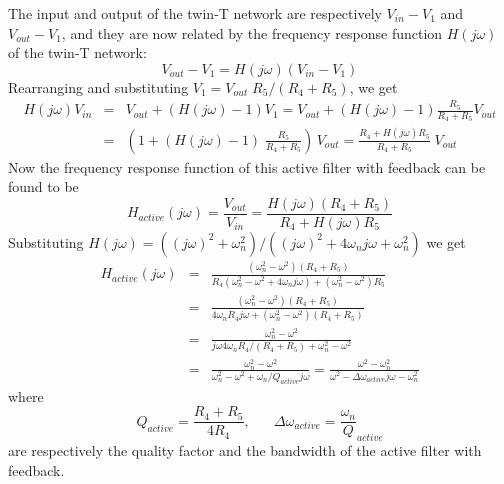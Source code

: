 \documentclass{article}
\begin{document}
The input and output of the twin-T network are respectively $V_{in}-V_1$ and
$V_{out}-V_1$, and they are now related by the frequency response function 
$H(j\omega)$ of the twin-T network:
\begin{equation}
V_{out}-V_1=H(j\omega)(V_{in}-V_1)
\end{equation}
Rearranging and substituting $V_1=V_{out}\;R_5/(R_4+R_5)$, we get
\begin{eqnarray}
  H(j\omega)V_{in}&=&V_{out}+(H(j\omega)-1) V_1
  =V_{out}+(H(j\omega)-1)\frac{R_5}{R_4+R_5}V_{out}
  \nonumber \\
  &=&\left(1+(H(j\omega)-1)\;\frac{R_5}{R_4+R_5}\right)\,V_{out}
  =\frac{R_4+H(j\omega)R_5}{R_4+R_5}\;V_{out}
\end{eqnarray}
Now the frequency response function of this active filter with feedback 
can be found to be
\begin{equation}
H_{active}(j\omega)=\frac{V_{out}}{V_{in}}
=\frac{H(j\omega)(R_4+R_5)}{R_4+H(j\omega)R_5}
\end{equation}
Substituting $H(j\omega)=((j\omega)^2+\omega_n^2)/((j\omega)^2+4\omega_n j\omega
+\omega_n^2)$ we get
\begin{eqnarray}
  H_{active}(j\omega)&=&\frac{(\omega_n^2-\omega^2)(R_4+R_5)}
  {R_4(\omega_n^2-\omega^2+4\omega_n j\omega)+(\omega_n^2-\omega^2)R_5}
  \nonumber \\
  &=&\frac{(\omega_n^2-\omega^2)(R_4+R_5)}
  {4\omega_nR_4 j\omega+(\omega_n^2-\omega^2)(R_4+R_5)}
  \nonumber \\
  &=&\frac{\omega_n^2-\omega^2}{j\omega 4\omega_n R_4/(R_4+R_5)+\omega_n^2-\omega^2}
  \nonumber \\
  &=&\frac{\omega_n^2-\omega^2}{\omega_n^2-\omega^2+\omega_n/Q_{active} j\omega}
  =\frac{\omega^2-\omega_n^2}{\omega^2-\Delta\omega_{active} j\omega-\omega^2_n}
\end{eqnarray}
where 
\begin{equation}
Q_{active}=\frac{R_4+R_5}{4R_4},\;\;\;\;\;\;
\Delta\omega_{active}=\frac{\omega_n}{Q}_{active}
\end{equation}
are respectively the quality factor and the bandwidth of the active 
filter with feedback. 
\end{document}
